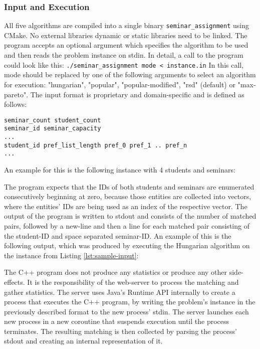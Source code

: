 \subsubsection{Input and Execution}
All five algorithms are compiled into a single binary \lstinline{seminar_assignment} using CMake. No external libraries dynamic or static libraries need to be linked. The program accepts an optional argument which specifies the algorithm to be used and then reads the problem instance on stdin. In detail, a call to the program could look like this: \lstinline{./seminar_assignment mode < instance.in} 
\newline
In this call, mode should be replaced by one of the following arguments to select an algorithm for execution: "hungarian", "popular", "popular-modified", "rsd" (default) or "max-pareto". The input format is proprietary and domain-specific and is defined as follows:
\begin{lstlisting}[frame=single, caption={Program input format},captionpos=b]
seminar_count student_count
seminar_id seminar_capacity
...
student_id pref_list_length pref_0 pref_1 .. pref_n
...
\end{lstlisting}

An example for this is the following instance with 4 students and seminars:


The program expects that the IDs of both students and seminars are enumerated consecutively beginning at zero, because those entities are collected into vectors, where the entities' IDs are being used as an index of the respective vector. The output of the program is written to stdout and consists of the number of matched pairs, followed by a new-line and then a line for each matched pair consisting of the student-ID and space separated seminar-ID. An example of this is the following output, which was produced by executing the Hungarian algorithm on the instance from Listing \ref{lst:sample-input}:


The C++ program does not produce any statistics or produce any other side-effects. It is the responsibility of the web-server to process the matching and gather statistics. The server uses Java's Runtime API internally to create a process that executes the C++ program, by writing the problem's instance in the previously described format to the new process' stdin. The server launches each new process in a new coroutine that suspends execution until the process terminates. The resulting matching is then collected by parsing the process' stdout and creating an internal representation of it. 

